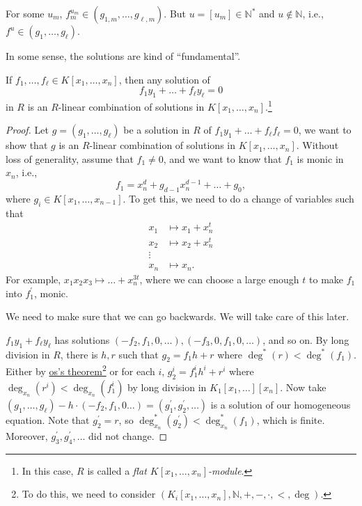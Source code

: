 \begin{note}
	For some \(u_m\), \(f_m^{u_m}\in (g_{1, m}, \dots , g_{\ell , m})\). But \(u = [u_m]\in \mathbb{N} ^{\ast} \) and \(u \notin \mathbb{N} \), i.e., \(f^u \in (g_1, \dots , g_{\ell })\).
\end{note}

In some sense, the solutions are kind of ``fundamental''.

\begin{theorem}\label{thm:lec26}
	If \(f_1, \dots , f_{\ell } \in K[x_1, \dots , x_n]\), then any solution of
	\[
		f_1 y_1 + \dots + f_{\ell } y_{\ell } = 0
	\]
	in \(R\) is an \(R\)-linear combination of solutions in \(K[x_1, \dots , x_n]\).\footnote{In this case, \(R\) is called a \emph{flat \(K[x_1, \dots , x_n]\)-module}.}
\end{theorem}
\begin{proof}
	Let \(g = (g_1, \dots , g_{\ell } )\) be a solution in \(R\) of \(f_1 y_1 + \dots + f_{\ell } f_{\ell } = 0 \), we want to show that \(g\) is an \(R\)-linear combination of solutions in \(K[x_1, \dots , x_n]\). Without loss of generality, assume that \(f_1 \neq 0\), and we want to know that \(f_1\) is monic in \(x_n\), i.e.,
	\[
		f_1 = x_n^d + g_{d-1} x_n^{d-1} + \dots + g_0,
	\]
	where \(g_i\in K[x_1, \dots , x_{n-1}]\). To get this, we need to do a change of variables such that
	\[
		\begin{split}
			x_1 &\mapsto x_1 + x_n^t \\
			x_2 &\mapsto x_2 + x_n^t \\
			\vdots& \\
			x_n &\mapsto x_n.
		\end{split}
	\]
	For example, \(x_1 x_2 x_3 \mapsto \dots + x_n^{3t}\), where we can choose a large enough \(t\) to make \(f_1\) into \(f_1^{\prime} \), monic.

	\begin{note}
		We need to make sure that we can go backwards. We will take care of this later.
	\end{note}

	\(f_1 y_1 + f_{\ell } y_{\ell }  \) has solutions \((-f_2, f_1, 0, \dots ), (-f_3, 0, f_1, 0, \dots )\), and so on. By long division in \(R\), there is \(h, r\) such that \(g_2 = f_1 h + r\) where \(\deg^{\ast} (r) < \deg ^{\ast} (f_1)\). Either by \hyperref[thm:Los]{os's theorem}\footnote{To do this, we need to consider \((K_i[x_1, \dots , x_n], \mathbb{N} , +, -, \cdot, < , \deg)\).} or for each \(i\), \(g_2^i = f_1^i h^i + r^i\) where \(\deg_{x_n}(r^i) < \deg_{x_n}(f_1^i)\) by long division in \(K_1[x_1, \dots ][x_n]\). Now take \((g_1, \dots , g_{\ell }) - h\cdot (-f_2, f_1, 0 \dots ) = (g_1 ^{\prime} , g_2 ^{\prime} , \dots )\) is a solution of our homogeneous equation. Note that \(g_2^{\prime} = r\), so \(\deg^{\ast} _{x_n}(g_2^{\prime} ) < \deg^{\ast} _{x_n}(f_1)\), which is finite. Moreover, \(g_3^{\prime} , g_4^{\prime} , \dots \) did not change.


\end{proof}
